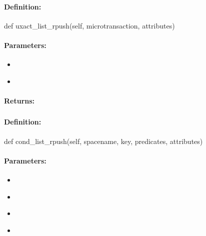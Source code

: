 \paragraph{Definition:}
\begin{pythoncode}
def uxact_list_rpush(self, microtransaction, attributes)
\end{pythoncode}

\paragraph{Parameters:}
\begin{itemize}[noitemsep]
\item {}\\

\item {}\\

\end{itemize}

\paragraph{Returns:}


\pagebreak
\subsubsection{}
\label{api:python:cond_list_rpush}


\paragraph{Definition:}
\begin{pythoncode}
def cond_list_rpush(self, spacename, key, predicates, attributes)
\end{pythoncode}

\paragraph{Parameters:}
\begin{itemize}[noitemsep]
\item {}\\

\item {}\\

\item {}\\

\item {}\\

\end{itemize}

